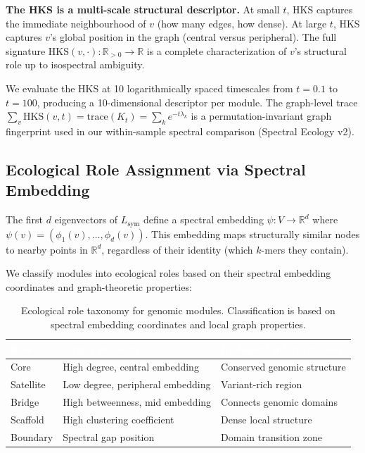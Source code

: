 \documentclass{../yalumba}
\begin{document}
\begin{keyfinding}
\textbf{The HKS is a multi-scale structural descriptor.}  At small $t$,
HKS captures the immediate neighbourhood of $v$ (how many edges, how
dense).  At large $t$, HKS captures $v$'s global position in the graph
(central versus peripheral).  The full signature $\mathrm{HKS}(v,
\cdot): \mathbb{R}_{>0} \to \mathbb{R}$ is a complete characterization
of $v$'s structural role up to isospectral ambiguity.
\end{keyfinding}

We evaluate the HKS at 10 logarithmically spaced timescales from $t =
0.1$ to $t = 100$, producing a 10-dimensional descriptor per module.
The graph-level trace $\sum_v \mathrm{HKS}(v, t) = \mathrm{trace}(K_t)
= \sum_k e^{-t\lambda_k}$ is a permutation-invariant graph fingerprint
used in our within-sample spectral comparison (Spectral Ecology v2).

\subsection{Ecological Role Assignment via Spectral Embedding}
\label{sec:framework:roles}

The first $d$ eigenvectors of $L_{\mathrm{sym}}$ define a spectral
embedding $\psi: V \to \mathbb{R}^d$ where $\psi(v) = (\phi_1(v),
\ldots, \phi_d(v))$.  This embedding maps structurally similar nodes to
nearby points in $\mathbb{R}^d$, regardless of their identity (which
$k$-mers they contain).

We classify modules into ecological roles based on their spectral
embedding coordinates and graph-theoretic properties:

\begin{table}[H]
  \centering
  \tablestyle
  \caption{Ecological role taxonomy for genomic modules.  Classification
    is based on spectral embedding coordinates and local graph
    properties.}
  \label{tab:roles}
  \begin{tabular}{lll}
    \toprule
    \rowcolor{table-header}
    \textcolor{white}{\textbf{Role}} &
    \textcolor{white}{\textbf{Graph property}} &
    \textcolor{white}{\textbf{Biological interpretation}} \\
    \midrule
    Core & High degree, central embedding & Conserved genomic structure \\
    Satellite & Low degree, peripheral embedding & Variant-rich region \\
    Bridge & High betweenness, mid embedding & Connects genomic domains \\
    Scaffold & High clustering coefficient & Dense local structure \\
    Boundary & Spectral gap position & Domain transition zone \\
    \bottomrule
  \end{tabular}
\end{table}
\end{document}
